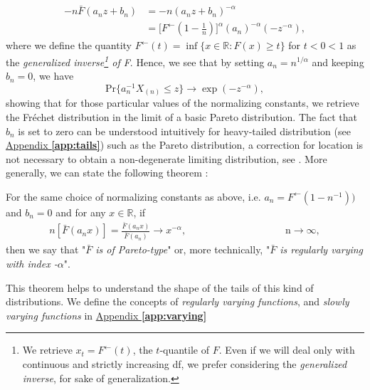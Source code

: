 \begin{equation*}
\begin{aligned}
-n\bar{F}(a_nz+b_n)
& =-n(a_nz+b_n)^{-\alpha} \\
& =\Big[F^{\leftarrow}(1-\frac{1}{n})\Big]^{\alpha}(a_n)^{-\alpha}(-z^{-\alpha}),
\end{aligned}
\end{equation*}
where we define the quantity $F^{\leftarrow}(t)=\inf\{x\in\mathbb{R}:F(x)\geq t\}$ for $t<0<1$ as the \emph{generalized inverse\footnote{We retrieve $x_t=F^{\leftarrow}(t)$, the $t$-quantile of $F$. Even if we will deal only with continuous and strictly increasing df, we prefer considering the \emph{generalized inverse}, for sake of generalization.} of F}.
Hence, we see that by setting $a_n=n^{1/\alpha}$ and keeping $b_n=0$, we have  
\begin{equation*}
\text{Pr}\{a_n^{-1}X_{(n)}\leq z\}\rightarrow \exp (-z^{-\alpha}),
\end{equation*}
showing that for those particular values of the normalizing constants, we retrieve the Fréchet distribution in the limit of a basic Pareto distribution. The fact that $b_n$ is set to zero can be understood intuitively for heavy-tailed distribution (see \hyperref[app:tails]{Appendix \textbf{\ref{app:tails}}}) such as the Pareto distribution, a correction for location is not necessary to obtain a non-degenerate limiting distribution, see \citet[pp.51]{beirlant_practical_1996}.
More generally, we can state the following theorem :
\begin{theorem} For the same choice of normalizing constants as above, i.e. $a_n=F^{\leftarrow}(1-n^{-1}))$ and $b_n=0$ and for any $x\in\mathbb{R}$, if
	\begin{equation}
	\begin{aligned}
	n[\bar{F}(a_nx)]= \frac{\bar{F}(a_nx)}{\bar{F}(a_n)}\rightarrow x^{-\alpha} ,&&&&&&&&&&&& \text{ n}\to\infty,
	\end{aligned}
	\end{equation}
	then we say that "\emph{$\bar{F}$ is of Pareto-type}" or, more technically, "\emph{$\bar{F}$ is regularly varying with index -$\alpha$}".
\end{theorem}

This theorem helps to understand the shape of the tails of this kind of distributions. 
We define the concepts of \emph{regularly varying functions}, and \emph{slowly varying functions} in \hyperref[app:varying]{Appendix \textbf{\ref{app:varying}}}

